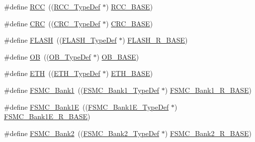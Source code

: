 \begin{DoxyCompactItemize}
\item 
\#define \hyperlink{group___peripheral__declaration_ga74944438a086975793d26ae48d5882d4}{R\+CC}~((\hyperlink{struct_r_c_c___type_def}{R\+C\+C\+\_\+\+Type\+Def} $\ast$) \hyperlink{group___peripheral__memory__map_ga0e681b03f364532055d88f63fec0d99d}{R\+C\+C\+\_\+\+B\+A\+SE})
\item 
\#define \hyperlink{group___peripheral__declaration_ga4381bb54c2dbc34500521165aa7b89b1}{C\+RC}~((\hyperlink{struct_c_r_c___type_def}{C\+R\+C\+\_\+\+Type\+Def} $\ast$) \hyperlink{group___peripheral__memory__map_ga656a447589e785594cbf2f45c835ad7e}{C\+R\+C\+\_\+\+B\+A\+SE})
\item 
\#define \hyperlink{group___peripheral__declaration_ga844ea28ba1e0a5a0e497f16b61ea306b}{F\+L\+A\+SH}~((\hyperlink{struct_f_l_a_s_h___type_def}{F\+L\+A\+S\+H\+\_\+\+Type\+Def} $\ast$) \hyperlink{group___peripheral__memory__map_ga8e21f4845015730c5731763169ec0e9b}{F\+L\+A\+S\+H\+\_\+\+R\+\_\+\+B\+A\+SE})
\item 
\#define \hyperlink{group___peripheral__declaration_gad2d5f875cdc6d696735f20fa23a895c3}{OB}~((\hyperlink{struct_o_b___type_def}{O\+B\+\_\+\+Type\+Def} $\ast$) \hyperlink{group___peripheral__memory__map_gab5b5fb155f9ee15dfb6d757da1adc926}{O\+B\+\_\+\+B\+A\+SE})
\item 
\#define \hyperlink{group___peripheral__declaration_ga3a3f60de4318afbd0b3318e7a416aadc}{E\+TH}~((\hyperlink{struct_e_t_h___type_def}{E\+T\+H\+\_\+\+Type\+Def} $\ast$) \hyperlink{group___peripheral__memory__map_gad965a7b1106ece575ed3da10c45c65cc}{E\+T\+H\+\_\+\+B\+A\+SE})
\item 
\#define \hyperlink{group___peripheral__declaration_ga2a759bad07fe730c99f9e1490e646220}{F\+S\+M\+C\+\_\+\+Bank1}~((\hyperlink{struct_f_s_m_c___bank1___type_def}{F\+S\+M\+C\+\_\+\+Bank1\+\_\+\+Type\+Def} $\ast$) \hyperlink{group___peripheral__memory__map_gad196fe6f5e4041b201d14f43508c06d2}{F\+S\+M\+C\+\_\+\+Bank1\+\_\+\+R\+\_\+\+B\+A\+SE})
\item 
\#define \hyperlink{group___peripheral__declaration_ga422986101f42a8811ae89ac69deb2759}{F\+S\+M\+C\+\_\+\+Bank1E}~((\hyperlink{struct_f_s_m_c___bank1_e___type_def}{F\+S\+M\+C\+\_\+\+Bank1\+E\+\_\+\+Type\+Def} $\ast$) \hyperlink{group___peripheral__memory__map_gaea182589c84aee30b7f735474d8774e2}{F\+S\+M\+C\+\_\+\+Bank1\+E\+\_\+\+R\+\_\+\+B\+A\+SE})
\item 
\#define \hyperlink{group___peripheral__declaration_gabb3dfb5e88694aa2983ecabd33a55e0a}{F\+S\+M\+C\+\_\+\+Bank2}~((\hyperlink{struct_f_s_m_c___bank2___type_def}{F\+S\+M\+C\+\_\+\+Bank2\+\_\+\+Type\+Def} $\ast$) \hyperlink{group___peripheral__memory__map_ga3cb46d62f4f6458e186a5a4c753e4918}{F\+S\+M\+C\+\_\+\+Bank2\+\_\+\+R\+\_\+\+B\+A\+SE})

\end{DoxyCompactItemize}

